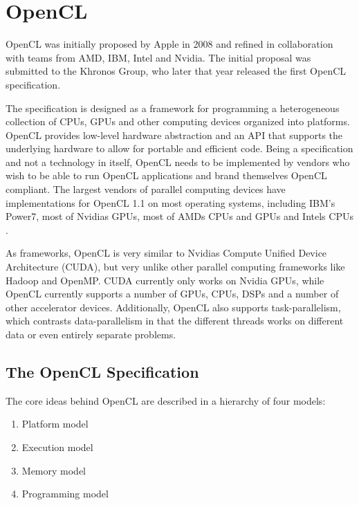 \section{OpenCL}

OpenCL was initially proposed by Apple in 2008 and refined in collaboration
with teams from AMD, IBM, Intel and Nvidia. The initial proposal was submitted
to the Khronos Group\cite{cl-spec}, who later that year released the first
OpenCL specification.

The specification is designed as a framework for programming a heterogeneous
collection of CPUs, GPUs and other computing devices organized into platforms.
OpenCL provides low-level hardware abstraction and an API that supports the
underlying hardware to allow for portable and efficient code. Being a
specification and not a technology in itself, OpenCL needs to be implemented
by vendors who wish to be able to run OpenCL applications and brand themselves
OpenCL compliant. The largest vendors of parallel computing devices have
implementations for OpenCL 1.1 on most operating systems, including IBM's
Power7\cite{ibm-opencl}, most of Nvidias GPUs\cite{nvidia-opencl}, most of
AMDs CPUs and GPUs \cite{amd-opencl} and Intels CPUs \cite{intel-opencl}.

As frameworks, OpenCL is very similar to Nvidias Compute Unified Device
Architecture (CUDA), but very unlike other parallel computing frameworks like
Hadoop\cite{hadoop} and OpenMP\cite{openmp}. CUDA currently only works on
Nvidia GPUs, while OpenCL currently supports a number of GPUs, CPUs, DSPs and
a number of other accelerator devices. Additionally, OpenCL also supports
task-parallelism, which contrasts data-parallelism in that the different
threads works on different data or even entirely separate problems.

\subsection{The OpenCL Specification}

The core ideas behind OpenCL are described in a hierarchy of four models\cite
{cl-spec}:

\begin{enumerate}
  \item Platform model
  \item Execution model
  \item Memory model
  \item Programming model
\end{enumerate}

